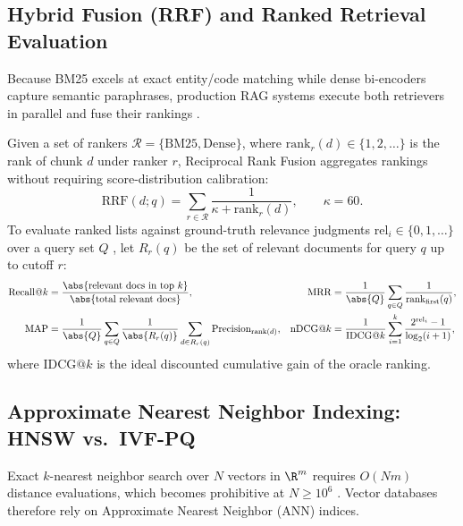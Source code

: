 \documentclass[../../../../master.tex]{subfiles}
\begin{document}
\subsection{Hybrid Fusion (RRF) and Ranked Retrieval Evaluation}
\label{sec:rag:rrf_eval}

Because BM25 excels at exact entity/code matching while dense bi-encoders capture semantic paraphrases, production RAG systems execute both retrievers in parallel and fuse their rankings .

\begin{coremath}
Given a set of rankers $\mathcal{R} = \{\text{BM25}, \text{Dense}\}$, where $\mathrm{rank}_r(d) \in \{1, 2, \dots\}$ is the rank of chunk $d$ under ranker $r$, Reciprocal Rank Fusion aggregates rankings without requiring score-distribution calibration:
\begin{equation}
  \mathrm{RRF}(d; q) = \sum_{r \in \mathcal{R}} \frac{1}{\kappa + \mathrm{rank}_r(d)}, \qquad \kappa = 60.
  \label{eq:rag:rrf}
\end{equation}
To evaluate ranked lists against ground-truth relevance judgments $\mathrm{rel}_i \in \{0, 1, \dots\}$ over a query set $Q$ , let $R_r(q)$ be the set of relevant documents for query $q$ up to cutoff $r$:
\begin{align}
  \mathrm{Recall}@k &= \frac{\abs{\text{relevant docs in top } k}}{\abs{\text{total relevant docs}}}, &
  \mathrm{MRR} &= \frac{1}{\abs{Q}} \sum_{q \in Q} \frac{1}{\mathrm{rank}_{\mathrm{first}}(q)}, \label{eq:rag:recall_mrr} \\
  \mathrm{MAP} &= \frac{1}{\abs{Q}} \sum_{q \in Q} \frac{1}{\abs{R_r(q)}} \sum_{d \in R_r(q)} \mathrm{Precision}_{\mathrm{rank}(d)}, &
  \mathrm{nDCG}@k &= \frac{1}{\mathrm{IDCG}@k} \sum_{i=1}^{k} \frac{2^{\mathrm{rel}_i} - 1}{\log_2(i + 1)}, \label{eq:rag:map_ndcg}
\end{align}
where $\mathrm{IDCG}@k$ is the ideal discounted cumulative gain of the oracle ranking.
\end{coremath}

\subsection{Approximate Nearest Neighbor Indexing: HNSW vs.\ IVF-PQ}
\label{sec:rag:ann}

Exact $k$-nearest neighbor search over $N$ vectors in $\R^m$ requires $O(Nm)$ distance evaluations, which becomes prohibitive at $N \ge 10^6$ . Vector databases therefore rely on Approximate Nearest Neighbor (ANN) indices.
\end{document}

